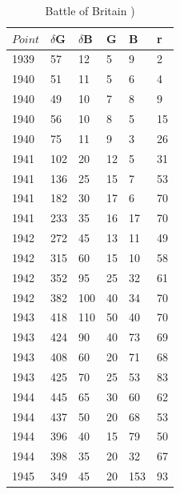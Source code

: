 \documentclass[]{article}
\begin{document}
\begin{table}
 

\tiny
\caption{Battle of Britain \cite{JohsonMackey:2011})\\}
\vspace{0.5cm}
\tiny

{\begin{tabular}{|p{.5cm}|p{.5cm}|p{.5cm}|p{.5cm}|p{.5cm}|p{.5cm}|} 
\hline
\centering

$Point$ & $\delta$G & $\delta$B	& G	& B & r \\
\hline  
1939&	57&	12&	5&	9&	2\\
1940&	51&	11&	5&	6&	4\\
1940&	49&	10&	7&	8&	9\\
1940&	56&	10&	8&	5&	15\\
1940&	75&	11&	9&	3&	26\\
1941&	102&	20&	12&	5&	31\\
1941&	136&	25&	15&	7&	53\\
1941&	182&	30&	17&	6&	70\\
1941&	233&	35&	16&	17&	70\\
1942&	272&	45&	13&	11&	49\\
1942&	315&	60&	15&	10&	58\\
1942&	352&	95&	25&	32&	61\\
1942&	382&	100&	40&	34&	70\\
1943&	418&	110&	50&	40&	70\\
1943&	424&	90&	40&	73&	69\\
1943&	408&	60&	20&	71&	68\\
1943&	425&	70&	25&	53&	83\\
1944&	445&	65&	30&	60&	62\\
1944&	437&	50&	20&	68&	53\\
1944&	396&	40&	15&	79&	50\\
1944&	398&	35&	20&	32&	67\\
1945&	349&	45&	20&	153&	93\\

\hline

\end{tabular}}%
\tiny
\end{table}
\end{document}
